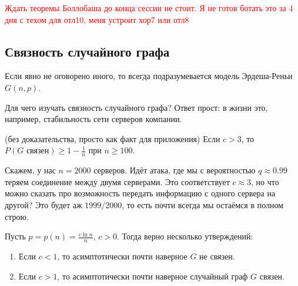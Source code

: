 \textcolor{red}{Ждать теоремы Боллобаша до конца сессии не стоит. Я не готов ботать это за 4 дня с техом для отл10, меня устроит хор7 или отл8}

\subsection{Связность случайного графа}

\begin{note}
	Если явно не оговорено иного, то всегда подразумевается модель Эрдеша-Реньи $G(n, p)$.
\end{note}

\begin{note}
	Для чего изучать связность случайного графа? Ответ прост: в жизни это, например, стабильность сети серверов компании.
\end{note}

\begin{theorem} (без доказательства, просто как факт для приложения)
	Если $c > 3$, то $P(G \text{ связен}) \ge 1 - \frac{1}{n}$ при $n \ge 100$.
\end{theorem}

\begin{note}
	Скажем, у нас $n = 2000$ серверов. Идёт атака, где мы с вероятностью $q \approx 0.99$ теряем соединение между двумя серверами. Это соответствует $c \approx 3$, но что можно сказать про возможность передать информацию с одного сервера на другой? Это будет аж $1999 / 2000$, то есть почти всегда мы остаёмся в полном строю.
\end{note}

\begin{theorem}
	Пусть $p = p(n) = \frac{c\ln n}{n}$, $c > 0$. Тогда верно несколько утверждений:
	\begin{enumerate}
		\item Если $c < 1$, то асимптотически почти наверное $G$ не связен.
		
		\item Если $c > 1$, то асимптотически почти наверное случайный граф $G$ связен.
	\end{enumerate}
\end{theorem}

